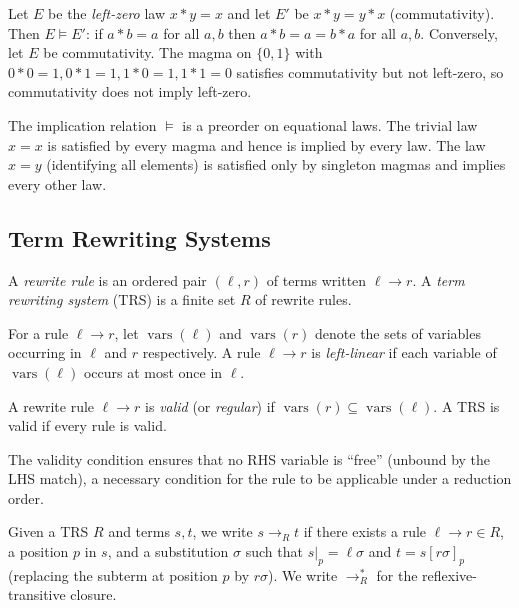 \begin{example}
Let $E$ be the \emph{left-zero} law $x * y = x$ and let $E'$ be $x * y = y * x$
(commutativity).  Then $E \models E'$: if $a * b = a$ for all $a, b$ then
$a * b = a = b * a$ for all $a, b$.  Conversely, let $E$ be commutativity.  The
magma on $\{0, 1\}$ with $0*0=1, 0*1=1, 1*0=1, 1*1=0$ satisfies commutativity
but not left-zero, so commutativity does not imply left-zero.
\end{example}

\begin{remark}
The implication relation $\models$ is a preorder on equational laws.  The trivial
law $x = x$ is satisfied by every magma and hence is implied by every law.  The
law $x = y$ (identifying all elements) is satisfied only by singleton magmas and
implies every other law.
\end{remark}

\subsection{Term Rewriting Systems}

\begin{definition}
A \emph{rewrite rule} is an ordered pair $(\ell, r)$ of terms written $\ell \to r$.
A \emph{term rewriting system} (TRS) is a finite set $R$ of rewrite rules.
\end{definition}

For a rule $\ell \to r$, let $\operatorname{vars}(\ell)$ and $\operatorname{vars}(r)$ denote the sets of
variables occurring in $\ell$ and $r$ respectively.  A rule $\ell \to r$ is
\emph{left-linear} if each variable of $\operatorname{vars}(\ell)$ occurs at most once in $\ell$.

\begin{definition}\label{def:valid-rule}
A rewrite rule $\ell \to r$ is \emph{valid} (or \emph{regular}) if
$\operatorname{vars}(r) \subseteq \operatorname{vars}(\ell)$.  A TRS is valid if every rule is valid.
\end{definition}

The validity condition ensures that no RHS variable is ``free'' (unbound by the LHS
match), a necessary condition for the rule to be applicable under a reduction order.

\begin{definition}
Given a TRS $R$ and terms $s, t$, we write $s \to_R t$ if there exists a rule
$\ell \to r \in R$, a position $p$ in $s$, and a substitution $\sigma$ such that
$s|_p = \ell\sigma$ and $t = s[r\sigma]_p$ (replacing the subterm at position $p$
by $r\sigma$).  We write $\to_R^*$ for the reflexive-transitive closure.
\end{definition}

